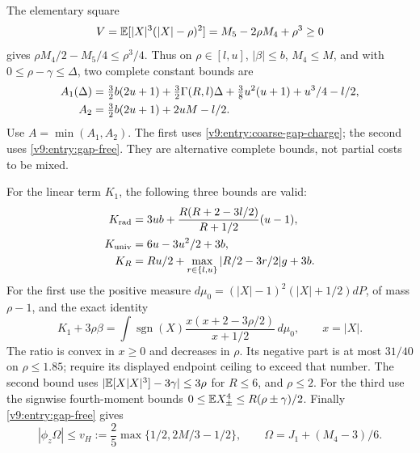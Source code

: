 The elementary square
\[
 V=\mathbb E[|X|^3(|X|-\rho)^2]=M_5-2\rho M_4+\rho^3\ge0
\]
gives $\rho M_4/2-M_5/4\le\rho^3/4$. Thus on
$\rho\in[l,u]$, $|\beta|\le b$, $M_4\le M$, and with
$0\le\rho-\gamma\le\Delta$, two complete constant bounds are
\begin{align}
 A_1(\Delta)&=\tfrac32b(2u+1)+\tfrac32\Gamma(R,l)\Delta
              +\tfrac38u^2(u+1)+u^3/4-l/2,\notag\\
 A_2&=\tfrac32b(2u+1)+2uM-l/2.\label{v9:entry:coarse-A}
\end{align}
Use $A=\min(A_1,A_2)$. The first uses
\eqref{v9:entry:coarse-gap-charge}; the second uses
\eqref{v9:entry:gap-free}. They are alternative complete bounds, not
partial costs to be mixed.

For the linear term $K_1$, the following three bounds are valid:
\begin{align*}
 K_{\rm rad}&=3ub+\frac{R(R+2-3l/2)}{R+1/2}(u-1),\\
 K_{\rm univ}&=6u-3u^2/2+3b,\\
 K_R&=Ru/2+\max_{r\in\{l,u\}}|R/2-3r/2|g+3b.
\end{align*}
For the first use the positive measure
$d\mu_0=(|X|-1)^2(|X|+1/2)dP$, of mass $\rho-1$, and the exact identity
\[
 K_1+3\rho\beta=
 \int\operatorname{sgn}(X)\frac{x(x+2-3\rho/2)}{x+1/2}\,d\mu_0,
 \qquad x=|X|.
\]
The ratio is convex in $x\ge0$ and decreases in $\rho$. Its negative
part is at most $31/40$ on $\rho\le1.85$; require its displayed
endpoint ceiling to exceed that number. The second bound uses
$|\mathbb E[X|X|^3]-3\gamma|\le3\rho$ for $R\le6$, and $\rho\le2$.
For the third use the signwise fourth-moment bounds
$0\le\mathbb E X_\pm^4\le R(\rho\pm\gamma)/2$.
Finally \eqref{v9:entry:gap-free} gives
\[
 |\phi_z\Omega|\le v_H:=\frac25\max\{1/2,2M/3-1/2\},
 \qquad\Omega=J_1+(M_4-3)/6.
\]

